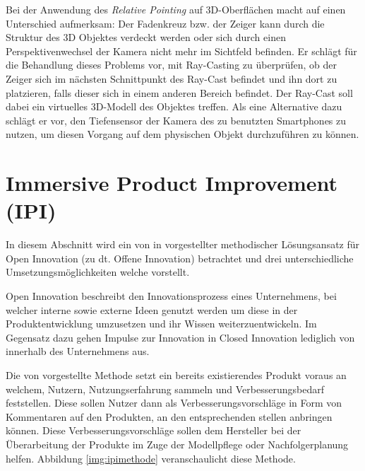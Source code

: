 Bei der Anwendung des \textit{Relative Pointing} auf 3D-Oberflächen macht \citeauthor{Vincent2014} auf einen Unterschied aufmerksam: Der Fadenkreuz bzw. der Zeiger kann durch die Struktur des
3D Objektes verdeckt werden oder sich durch einen Perspektivenwechsel der Kamera nicht mehr im Sichtfeld befinden. Er schlägt für die Behandlung dieses Problems vor, mit Ray-Casting zu überprüfen, 
ob der Zeiger sich im nächsten Schnittpunkt des Ray-Cast befindet und ihn dort zu platzieren, falls dieser sich in einem anderen Bereich befindet. Der Ray-Cast soll dabei ein virtuelles 3D-Modell des Objektes treffen.
Als eine Alternative dazu schlägt er vor, den Tiefensensor der Kamera des zu benutzten Smartphones zu nutzen, um diesen Vorgang auf dem physischen Objekt durchzuführen zu können. \cite[S.~83]{Vincent2014}

\section{Immersive Product Improvement (IPI)} \label{ipi_section}

In diesem Abschnitt wird ein von \citeauthor{Kirschner2012} in \cite{Kirschner2012} vorgestellter methodischer Lösungsansatz für Open Innovation (zu dt. Offene Innovation) betrachtet und 
drei unterschiedliche Umsetzungsmöglichkeiten welche \citeauthor{Kirschner2012} vorstellt. 

Open Innovation beschreibt den Innovationsprozess eines Unternehmens, bei welcher interne sowie externe Ideen genutzt werden um diese in der Produktentwicklung umzusetzen und ihr Wissen weiterzuentwickeln. 
Im Gegensatz dazu gehen Impulse zur Innovation in Closed Innovation  lediglich von innerhalb des Unternehmens aus.\cite[S.~32]{Kirschner2012}

Die von \citeauthor{Kirschner2012} vorgestellte Methode setzt ein bereits existierendes Produkt voraus an welchem,  Nutzern,  Nutzungserfahrung sammeln und Verbesserungsbedarf feststellen. 
Diese sollen Nutzer dann als Verbesserungsvorschläge in Form von Kommentaren auf den Produkten, an den entsprechenden stellen anbringen können. Diese Verbesserungsvorschläge sollen dem Hersteller
bei der Überarbeitung der Produkte im Zuge der Modellpflege oder Nachfolgerplanung helfen. Abbildung \ref{img:ipimethode} veranschaulicht diese Methode. \cite[S.~122]{Kirschner2012}

